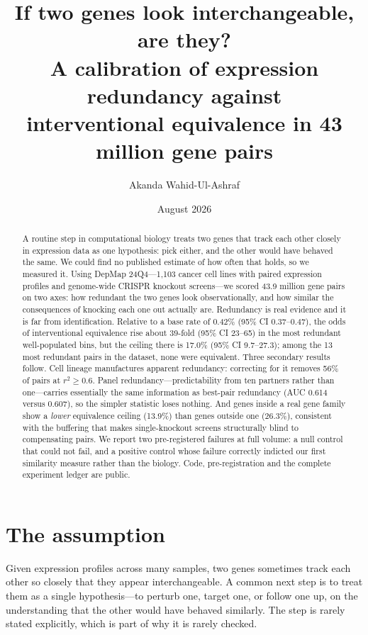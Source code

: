\documentclass[11pt]{article}
\title{If two genes look interchangeable, are they?\\
A calibration of expression redundancy against\\
interventional equivalence in 43 million gene pairs}
\author{Akanda Wahid-Ul-Ashraf}
\date{August 2026}
\begin{document}
\maketitle

\begin{abstract}
A routine step in computational biology treats two genes that track each
other closely in expression data as one hypothesis: pick either, and the
other would have behaved the same. We could find no published estimate of
how often that holds, so we measured it. Using DepMap 24Q4---1,103 cancer
cell lines with paired expression profiles and genome-wide CRISPR knockout
screens---we scored 43.9 million gene pairs on two axes: how redundant the
two genes look observationally, and how similar the consequences of knocking
each one out actually are. Redundancy is real evidence and it is far from
identification. Relative to a base rate of 0.42\% (95\% CI 0.37--0.47), the
odds of interventional equivalence rise about 39-fold (95\% CI 23--65) in
the most redundant well-populated bins, but the ceiling there is 17.0\%
(95\% CI 9.7--27.3); among the 13 most redundant pairs in the dataset, none
were equivalent. Three secondary results follow. Cell lineage manufactures
apparent redundancy: correcting for it removes 56\% of pairs at $r^2 \ge
0.6$. Panel redundancy---predictability from ten partners rather than
one---carries essentially the same information as best-pair redundancy
(AUC 0.614 versus 0.607), so the simpler statistic loses nothing. And genes
inside a real gene family show a \emph{lower} equivalence ceiling (13.9\%)
than genes outside one (26.3\%), consistent with the buffering that makes
single-knockout screens structurally blind to compensating pairs. We report
two pre-registered failures at full volume: a null control that could not
fail, and a positive control whose failure correctly indicted our first
similarity measure rather than the biology. Code, pre-registration and the
complete experiment ledger are public.
\end{abstract}

\section{The assumption}

Given expression profiles across many samples, two genes sometimes track
each other so closely that they appear interchangeable. A common next step
is to treat them as a single hypothesis---to perturb one, target one, or
follow one up, on the understanding that the other would have behaved
similarly. The step is rarely stated explicitly, which is part of why it is
rarely checked.
\end{document}
